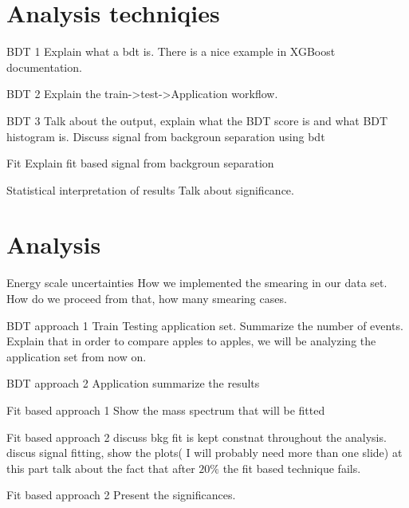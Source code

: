 \documentclass[bigger]{beamer}
\begin{document}
\section{Analysis techniqies}
\label{sec:org44745d0}
\begin{frame}[label={sec:orge39b4fa}]{BDT 1}
Explain what a bdt is. There is a nice example in XGBoost documentation. 
\end{frame}
\begin{frame}[label={sec:orgc2a4e94}]{BDT 2}
Explain the train->test->Application workflow. 
\end{frame}
\begin{frame}[label={sec:orgd69b9ae}]{BDT 3}
Talk about the output, explain what the BDT score is and what BDT histogram is. Discuss signal from backgroun separation using bdt
\end{frame}
\begin{frame}[label={sec:org597d79b}]{Fit}
Explain fit based signal from backgroun separation
\end{frame}
\begin{frame}[label={sec:org2203ef3}]{Statistical interpretation of results}
Talk about significance.
\end{frame}
\section{Analysis}
\label{sec:orgfbec8f3}
\begin{frame}[label={sec:org777bb3b}]{Energy scale uncertainties}
How we implemented the smearing in our data set. How do we proceed from that, how many smearing cases. 
\end{frame}
\begin{frame}[label={sec:orgb59b6e5}]{BDT approach 1}
Train Testing application set. Summarize the number of events. Explain that in order to compare apples to apples, we will be analyzing the application set from now on.
\end{frame}
\begin{frame}[label={sec:org89e91c5}]{BDT approach 2}
Application summarize the results 
\end{frame}
\begin{frame}[label={sec:org7e4723b}]{Fit based approach 1}
Show the mass spectrum that will be fitted 
\end{frame}
\begin{frame}[label={sec:orga2ddd25}]{Fit based approach 2}
discuss bkg fit is kept constnat throughout the analysis. discus signal fitting, show the plots( I will probably need more than one slide) at this part talk about the fact that after \(20\%\) the fit based technique fails. 
\end{frame}
\begin{frame}[label={sec:orgb41d5fc}]{Fit based approach 2}
Present the significances.
\end{frame}
\end{document}
